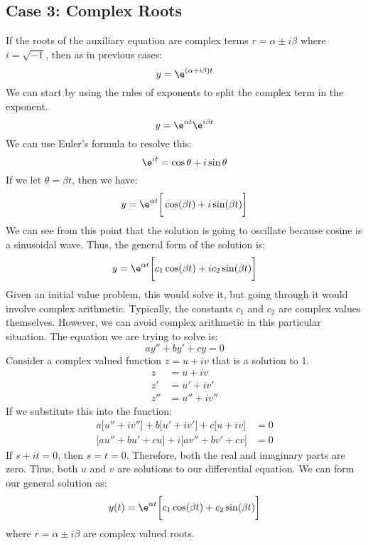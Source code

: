 \documentclass{math}
\begin{document}
\subsection*{Case 3: Complex Roots}
If the roots of the auxiliary equation are complex terms \( r = \alpha\pm
i\beta \) where \( i = \sqrt{-1} \), then as in previous cases:
\[ y = \e^{(\alpha+i\beta)t} \]
We can start by using the rules of exponents to split the complex term in the
exponent.
\[ y = \e^{\alpha t}\e^{i\beta t} \]
We can use Euler's formula to resolve this:
\[ \e^{it} = \cos\theta+i\sin\theta \]
If we let \( \theta = \beta t \), then we have:
\[ y = \e^{\alpha t}\bigg[\cos(\beta t)+i\sin(\beta t)\bigg] \]
We can see from this point that the solution is going to oscillate because
cosine is a sinusoidal wave. Thus, the general form of the solution is:
\[ y = \e^{\alpha t}\bigg[c_1\cos(\beta t)+ic_2\sin(\beta t)\bigg] \]
Given an initial value problem, this would solve it, but going through it would
involve complex arithmetic. Typically, the constants \( c_1 \) and \( c_2 \) are
complex values themselves. However, we can avoid complex arithmetic in this
particular situation. The equation we are trying to solve is:
\[ ay''+by'+cy = 0 \]
Consider a complex valued function \( z = u+iv \) that is a solution to 1.
\begin{align*}
  z &= u+iv \\
  z' &= u'+iv' \\
  z'' &= u''+iv''
\end{align*}
If we substitute this into the function:
\begin{align*}
  a\bigg[u''+iv''\bigg]+b\bigg[u'+iv'\bigg]+c\bigg[u+iv\bigg] &= 0 \\
  \bigg[au''+bu'+cu\bigg]+i\bigg[av''+bv'+cv\bigg] &= 0
\end{align*}
If \( s+it = 0 \), then \( s = t = 0 \). Therefore, both the real and imaginary
parts are zero. Thus, both \( u \) and \( v \) are solutions to our differential
equation. We can form our general solution as:
\[ y(t) = \e^{\alpha t}\bigg[c_1\cos(\beta t)+c_2\sin(\beta t)\bigg] \]
where \( r = \alpha\pm i\beta \) are complex valued roots.
\end{document}
